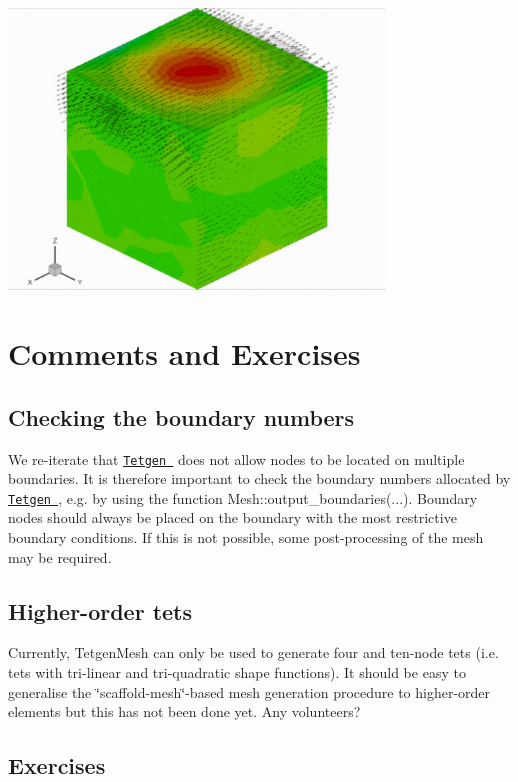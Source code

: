 
\begin{DoxyImage}
\includegraphics[width=0.75\textwidth]{flow}
\end{DoxyImage}




 

\hypertarget{index_comments}{}\section{Comments and Exercises}\label{index_comments}
\hypertarget{index_check}{}\subsection{Checking the boundary numbers}\label{index_check}
We re-\/iterate that \href{http://wias-berlin.de/software/tetgen//}{\tt {\ttfamily Tetgen} } does not allow nodes to be located on multiple boundaries. It is therefore important to check the boundary numbers allocated by \href{http://wias-berlin.de/software/tetgen//}{\tt {\ttfamily Tetgen} }, e.\+g. by using the function {\ttfamily Mesh\+::output\+\_\+boundaries}(...). Boundary nodes should always be placed on the boundary with the most restrictive boundary conditions. If this is not possible, some post-\/processing of the mesh may be required.\hypertarget{index_elements}{}\subsection{Higher-\/order tets}\label{index_elements}
Currently, {\ttfamily Tetgen\+Mesh} can only be used to generate four and ten-\/node tets (i.\+e. tets with tri-\/linear and tri-\/quadratic shape functions). It should be easy to generalise the \char`\"{}scaffold-\/mesh\char`\"{}-\/based mesh generation procedure to higher-\/order elements but this has not been done yet. Any volunteers?\hypertarget{index_ex}{}\subsection{Exercises}\label{index_ex}

